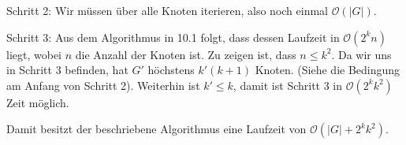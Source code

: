 \documentclass[a4paper]{scrartcl}
\newcommand{\Oh}{\mathcal{O}}
\begin{document}
\begin{enumerate}[label=\bfseries \arabic*.]
\begin{enumerate}
        Schritt 2:
        Wir müssen über alle Knoten iterieren, also noch einmal $\Oh(|G|)$.

        Schritt 3:
        Aus dem Algorithmus in 10.1 folgt, dass dessen Laufzeit in $\Oh(2^k n)$ liegt,
        wobei $n$ die Anzahl der Knoten ist. Zu zeigen ist, dass $n \leq k^2$.
        Da wir uns in Schritt 3 befinden, hat $G'$ höchstens $k'(k+1)$ Knoten.
        (Siehe die Bedingung am Anfang von Schritt 2).
        Weiterhin ist $k' \leq k$, damit ist Schritt 3 in $\Oh(2^kk^2)$ Zeit möglich.

        Damit besitzt der beschriebene Algorithmus eine Laufzeit von
        $\Oh(|G| + 2^kk^2)$.

\end{enumerate}
\end{enumerate}
\end{document}
